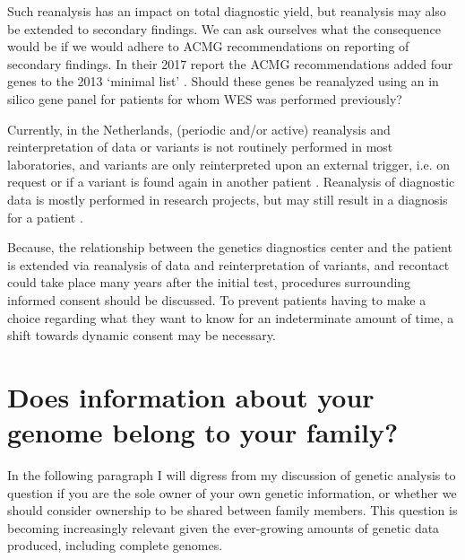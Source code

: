 Such reanalysis has an impact on total diagnostic yield, but reanalysis may also be extended to secondary findings. 
We can ask ourselves what the consequence would be if we would adhere to ACMG recommendations on reporting of secondary findings. 
In their 2017 report the ACMG recommendations added four genes to the 2013 ‘minimal list’ \cite{Kalia_2016}. 
Should these genes be reanalyzed using an in silico gene panel for patients for whom WES was performed previously? 

Currently, in the Netherlands, (periodic and/or active) reanalysis and reinterpretation of data or variants is not routinely performed in most laboratories, and variants are only reinterpreted upon an external trigger, i.e. on request or if a variant is found again in another patient \cite{El_Mecky_2019}.
Reanalysis of diagnostic data is mostly performed in research projects, but may still result in a diagnosis for a patient \cite{RadboudUMC_2018,SolveRD_nd}. 

Because, the relationship between the genetics diagnostics center and the patient is extended via reanalysis of data and reinterpretation of variants, and recontact could take place many years after the initial test, procedures surrounding informed consent should be discussed. 
To prevent patients having to make a choice regarding what they want to know for an indeterminate amount of time, a shift towards dynamic consent \cite{Kaye_2015} may be necessary.

\section{Does information about your genome belong to your family? }
In the following paragraph I will digress from my discussion of genetic analysis to question if you are the sole owner of your own genetic information, or whether we should consider ownership to be shared between family members. 
This question is becoming increasingly relevant given the ever-growing amounts of genetic data produced, including complete genomes. 

